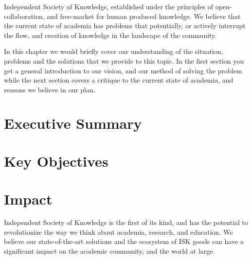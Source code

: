 Independent Society of Knowledge, established under the principles of open-collaboration, and free-market for human produced knowledge.
We believe that the current state of academia has problems that potentially, or actively interrupt the flow, and creation of knowledge in the landscape of the community.

In this chapter we would briefly cover our understanding of the situation, problems and the solutions that we provide to this topic.
In the first section you get a general introduction to our vision, and our method of solving the problem while the next section covers a critique to the current state of academia, and reasons we believe in our plan.


\section{Executive Summary}\label{sec:executive-summary}



\section{Key Objectives}\label{sec:key-objectives}



\section{Impact}\label{sec:impact}
Independent Society of Knowledge is the first of its kind, and has the potential to revolutionize the way we think about academia, research, and education.
We believe our state-of-the-art solutions and the ecosystem of ISK goods can have a significant impact on the academic community, and the world at large.

